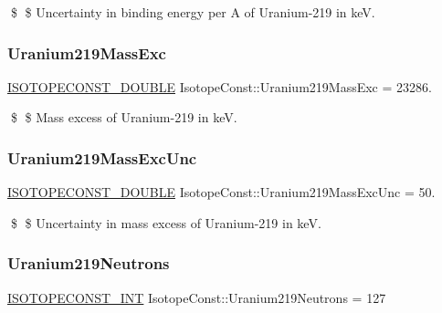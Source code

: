 \$ \$ Uncertainty in binding energy per A of Uranium-\/219 in keV. \mbox{\label{group___isotope_const-_uranium-_u219_ga6ee597f2b652e8d782e50cb983af042c}} 
\subsubsection{\texorpdfstring{Uranium219\+Mass\+Exc}{Uranium219MassExc}}
{\footnotesize\ttfamily \mbox{\hyperlink{group___isotope_const-_macros_ga8f45a7272ce02c0b4c65c44636ed719a}{I\+S\+O\+T\+O\+P\+E\+C\+O\+N\+S\+T\+\_\+\+D\+O\+U\+B\+LE}} Isotope\+Const\+::\+Uranium219\+Mass\+Exc = 23286.}

\$ \$ Mass excess of Uranium-\/219 in keV. \mbox{\label{group___isotope_const-_uranium-_u219_gaf71bb6525b5aebb57bdfbd27e39a7f87}} 
\subsubsection{\texorpdfstring{Uranium219\+Mass\+Exc\+Unc}{Uranium219MassExcUnc}}
{\footnotesize\ttfamily \mbox{\hyperlink{group___isotope_const-_macros_ga8f45a7272ce02c0b4c65c44636ed719a}{I\+S\+O\+T\+O\+P\+E\+C\+O\+N\+S\+T\+\_\+\+D\+O\+U\+B\+LE}} Isotope\+Const\+::\+Uranium219\+Mass\+Exc\+Unc = 50.}

\$ \$ Uncertainty in mass excess of Uranium-\/219 in keV. \mbox{\label{group___isotope_const-_uranium-_u219_ga17fe80a3d6932756f75ac8b83b810333}} 
\subsubsection{\texorpdfstring{Uranium219\+Neutrons}{Uranium219Neutrons}}
{\footnotesize\ttfamily \mbox{\hyperlink{group___isotope_const-_macros_ga5f18360b3e99483a35c32d789e62621c}{I\+S\+O\+T\+O\+P\+E\+C\+O\+N\+S\+T\+\_\+\+I\+NT}} Isotope\+Const\+::\+Uranium219\+Neutrons = 127}

